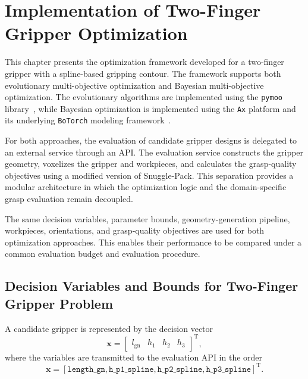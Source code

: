 \section{Implementation of Two-Finger Gripper Optimization}
\label{sec:two_finger_gripper_optimization}

This chapter presents the optimization framework developed for a two-finger gripper with a
spline-based gripping contour. The framework supports both evolutionary multi-objective optimization
and Bayesian multi-objective optimization. The evolutionary algorithms are implemented using the
\texttt{pymoo} library~\cite{pymoo}, while Bayesian optimization is implemented using the
\texttt{Ax} platform and its underlying \texttt{BoTorch} modeling
framework~\cite{olson2025ax,botorch}.

For both approaches, the evaluation of candidate gripper designs is delegated to an external service
through an API. The evaluation service constructs the gripper geometry, voxelizes the gripper and
workpieces, and calculates the grasp-quality objectives using a modified version of Snuggle-Pack\cite{snuggle_pack}.
This separation provides a modular architecture in which the optimization logic and the
domain-specific grasp evaluation remain decoupled.

The same decision variables, parameter bounds, geometry-generation pipeline, workpieces,
orientations, and grasp-quality objectives are used for both optimization approaches. This enables
their performance to be compared under a common evaluation budget and evaluation procedure.

\subsection{Decision Variables and Bounds for Two-Finger Gripper Problem}
\label{sec:two_finger_decision_variables}

A candidate gripper is represented by the decision vector
\begin{equation}
    \mathbf{x}
    =
    \begin{bmatrix}
        l_{\mathrm{gn}} &
        h_1 &
        h_2 &
        h_3
    \end{bmatrix}^{\mathrm{T}},
\end{equation}
where the variables are transmitted to the evaluation API in the order
\begin{equation}
    \mathbf{x}
    =
    [
        \texttt{length\_gn},
        \texttt{h\_p1\_spline},
        \texttt{h\_p2\_spline},
        \texttt{h\_p3\_spline}
    ]^{\mathrm{T}}.
\end{equation}

